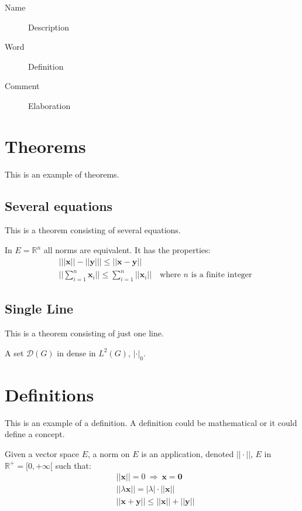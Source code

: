 \begin{description}
	\item[Name] Description
	\item[Word] Definition
	\item[Comment] Elaboration
\end{description}

\section{Theorems}

This is an example of theorems.

\subsection{Several equations}
This is a theorem consisting of several equations.

\begin{theorem}
	In $E=\mathbb{R}^n$ all norms are equivalent. It has the properties:
	\begin{align}
	& \big| ||\mathbf{x}|| - ||\mathbf{y}|| \big|\leq || \mathbf{x}- \mathbf{y}||\\
	&  ||\sum_{i=1}^n\mathbf{x}_i||\leq \sum_{i=1}^n||\mathbf{x}_i||\quad\text{where $n$ is a finite integer}
	\end{align}
\end{theorem}

\subsection{Single Line}
This is a theorem consisting of just one line.

\begin{theorem}
	A set $\mathcal{D}(G)$ in dense in $L^2(G)$, $|\cdot|_0$. 
\end{theorem}


\section{Definitions}

This is an example of a definition. A definition could be mathematical or it could define a concept.

\begin{definition}
	Given a vector space $E$, a norm on $E$ is an application, denoted $||\cdot||$, $E$ in $\mathbb{R}^+=[0,+\infty[$ such that:
	\begin{align}
	& ||\mathbf{x}||=0\ \Rightarrow\ \mathbf{x}=\mathbf{0}\\
	& ||\lambda \mathbf{x}||=|\lambda|\cdot ||\mathbf{x}||\\
	& ||\mathbf{x}+\mathbf{y}||\leq ||\mathbf{x}||+||\mathbf{y}||
	\end{align}
\end{definition}

